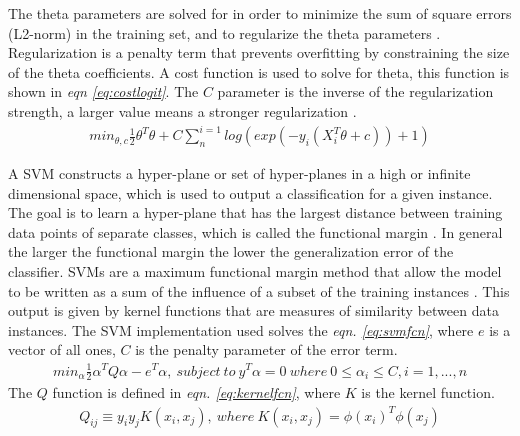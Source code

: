 \documentclass[ms]{nuthesis}
\begin{document}
\FloatBarrier
The theta parameters are solved for in order to minimize the sum of square errors (L2-norm)
in the training set, and to regularize the theta parameters \cite{scikit-learn}. Regularization is
a penalty term that prevents overfitting by constraining the size of the theta coefficients.
A cost function is used to solve for theta, this
function is shown in \textit{eqn \ref{eq:costlogit}}. The $C$ parameter is the inverse of the regularization
strength, a larger value means a stronger regularization \cite{scikit-learn}.
\FloatBarrier
\begin{equation}
\label{eq:costlogit}
\begin{aligned}
min_{\theta,c}\frac{1}{2}\theta^{T}\theta + C\sum_{n}^{i=1}log(exp(-y_i(X_{i}^{T}\theta+c))+1)
\end{aligned}
\end{equation}
\FloatBarrier
\par A SVM constructs a hyper-plane or set of hyper-planes in a high or infinite dimensional space, which
is used to output a classification for a given instance. The goal is to learn a hyper-plane that has
the largest distance between training data points of separate classes, which is called the functional margin
\cite{scikit-learn}. In general the larger the functional margin the lower the generalization error of the
classifier. SVMs are a maximum functional margin method that allow the model to be written as a sum of the
influence of a subset of the training instances \cite{ethem}. This output is given by kernel functions
that are measures of similarity between data instances. The SVM implementation used solves the
\textit{eqn. \ref{eq:svmfcn}}, where $e$ is a vector of all ones, $C$ is the penalty parameter of the
error term.
\FloatBarrier
\begin{equation}
\label{eq:svmfcn}
\begin{aligned}
min_{\alpha} \frac{1}{2} \alpha^{T} Q\alpha - e^T\alpha, \
subject\  to\ y^T \alpha = 0 \ where\ 0\leq\alpha_i\leq C,i=1,...,n
\end{aligned}
\end{equation}
\FloatBarrier
The $Q$ function is defined in \textit{eqn. \ref{eq:kernelfcn}}, where $K$ is the kernel function.
\FloatBarrier
\begin{equation}
\label{eq:kernelfcn}
\begin{aligned}
Q_{ij}\equiv y_i y_j K(x_i,x_j), \ where \ K(x_i,x_j)=\phi (x_i)^T \phi(x_j)
\end{aligned}
\end{equation}
\FloatBarrier
\end{document}
